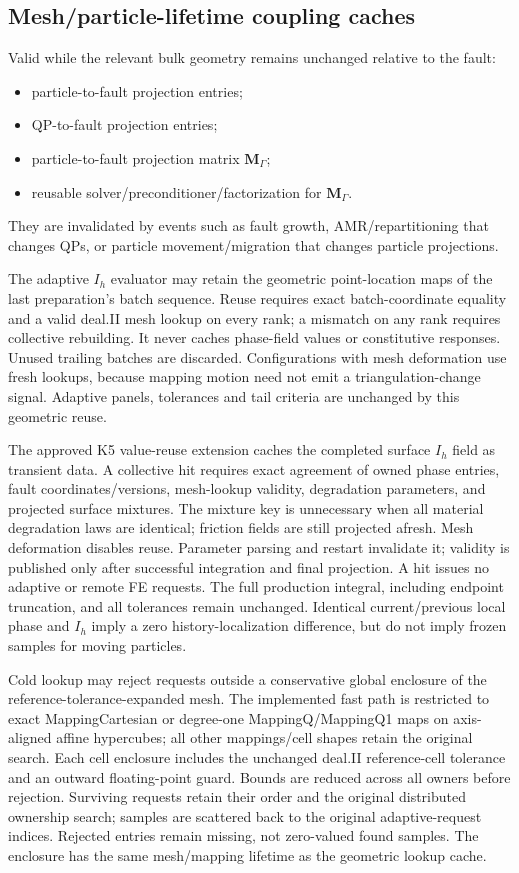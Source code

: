 \documentclass[11pt]{article}
\begin{document}
\subsection{Mesh/particle-lifetime coupling caches}
Valid while the relevant bulk geometry remains unchanged relative to the fault:
\begin{itemize}
  \item particle-to-fault projection entries;
  \item QP-to-fault projection entries;
  \item particle-to-fault projection matrix $\mathbf{M}_\Gamma$;
  \item reusable solver/preconditioner/factorization for $\mathbf{M}_\Gamma$.
\end{itemize}

They are invalidated by events such as fault growth, AMR/repartitioning that changes QPs, or particle movement/migration that changes particle projections.

The adaptive $I_h$ evaluator may retain the geometric point-location maps of
the last preparation's batch sequence. Reuse requires exact batch-coordinate
equality and a valid deal.II mesh lookup on every rank; a mismatch on any rank
requires collective rebuilding. It never caches phase-field values or
constitutive responses. Unused trailing batches are discarded. Configurations
with mesh deformation use fresh lookups, because mapping motion need not emit
a triangulation-change signal. Adaptive panels, tolerances and tail criteria
are unchanged by this geometric reuse.

The approved K5 value-reuse extension caches the completed surface $I_h$ field
as transient data. A collective hit requires exact agreement of owned phase
entries, fault coordinates/versions, mesh-lookup validity, degradation parameters,
and projected surface mixtures. The mixture key is unnecessary when all material
degradation laws are identical; friction fields are still projected afresh.
Mesh deformation disables reuse. Parameter parsing and restart invalidate it;
validity is published only after successful integration and final projection.
A hit issues no adaptive or remote FE requests. The full production integral,
including endpoint truncation, and all tolerances remain unchanged.
Identical current/previous local phase and $I_h$ imply a zero history-localization
difference, but do not imply frozen samples for moving particles.

Cold lookup may reject requests outside a conservative global enclosure of
the reference-tolerance-expanded mesh. The implemented fast path is restricted
to exact MappingCartesian or degree-one MappingQ/MappingQ1 maps on axis-aligned affine hypercubes;
all other mappings/cell shapes retain the original search. Each cell enclosure
includes the unchanged deal.II reference-cell tolerance and an outward
floating-point guard. Bounds are reduced across all owners before rejection.
Surviving requests retain their order and the original distributed ownership
search; samples are scattered back to the original adaptive-request indices.
Rejected entries remain missing, not zero-valued found samples. The enclosure
has the same mesh/mapping lifetime as the geometric lookup cache.
\end{document}

